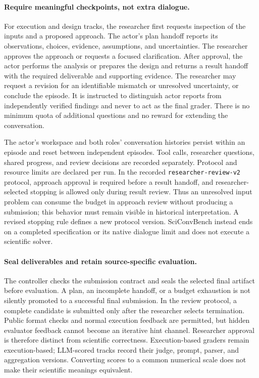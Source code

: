 \paragraph{Require meaningful checkpoints, not extra dialogue.}
For execution and design tracks, the researcher first requests inspection
of the inputs and a proposed approach. The actor's plan handoff reports its
observations, choices, evidence, assumptions, and uncertainties. The
researcher approves the approach or requests a focused clarification.
After approval, the actor performs the analysis or prepares the design and
returns a result handoff with the required deliverable and supporting
evidence. The researcher may request a revision for an identifiable
mismatch or unresolved uncertainty, or conclude the episode. It is
instructed to distinguish actor reports from independently verified
findings and never to act as the final grader. There is no minimum quota of
additional questions and no reward for extending the conversation.

The actor's workspace and both roles' conversation histories persist within
an episode and reset between independent episodes. Tool calls, researcher
questions, shared progress, and review decisions are recorded separately.
Protocol and resource limits are declared per run. In the recorded
\texttt{researcher-review-v2} protocol, approach approval is required before
a result handoff, and researcher-selected stopping is allowed only during
result review. Thus an unresolved input problem can consume the budget in
approach review without producing a submission; this behavior must remain
visible in historical interpretation. A revised stopping rule defines a new
protocol version. SciConvBench instead ends on a completed specification
or its native dialogue limit and does not execute a scientific solver.

\paragraph{Seal deliverables and retain source-specific evaluation.}
The controller checks the submission contract and seals the selected final
artifact before evaluation. A plan, an incomplete handoff, or a budget
exhaustion is not silently promoted to a successful final submission. In
the review protocol, a complete candidate is submitted only after the
researcher selects termination. Public format checks and normal execution
feedback are permitted, but hidden evaluator feedback cannot become an
iterative hint channel. Researcher approval is therefore distinct from
scientific correctness. Execution-based graders remain execution-based;
LLM-scored tracks record their judge, prompt, parser, and aggregation
versions. Converting scores to a common numerical scale does not make their
scientific meanings equivalent.

